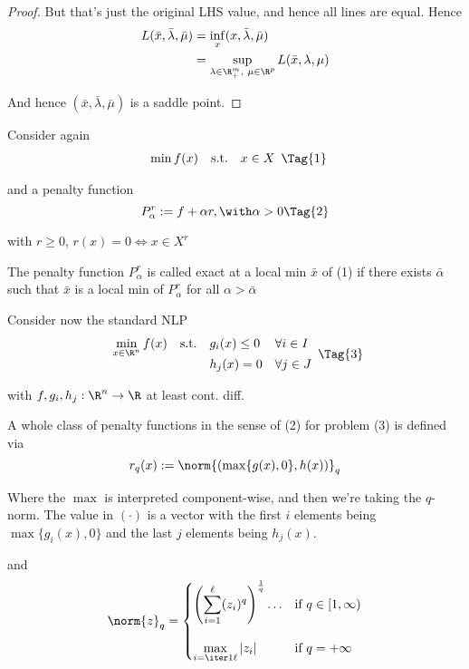 \begin{proof}
  But that's just the original LHS value, and hence all lines are equal. Hence
  \begin{align*}
    L(\bar x,\bar\lambda,\bar\mu)
     & =\inf_{x} (x,\bar\lambda,\bar\mu)                          \\
     & =\sup_{\lambda\in\R^m_+,\ \mu\in\R^p}L(\bar x,\lambda,\mu) \\
  \end{align*}

  And hence $(\bar x,\bar\lambda,\bar\mu)$ is a saddle point.
\end{proof}



Consider again
\begin{equation*}
  \begin{array}{l l l}
    \min f(x) & \text{s.t.} & x\in X
  \end{array}\Tag{1}
\end{equation*}

and a penalty function
\begin{equation*}
  P_\alpha^r:=f+\alpha r,\with \alpha>0\Tag{2}
\end{equation*}

with $r\geq0$, $r(x)=0\iff x\in X^r$


The penalty function $P_\alpha^r$ is called exact at a local min $\bar x$ of
(1) if there exists $\bar\alpha$ such that $\bar x$ is a local min of
$P_\alpha^r$ for all $\alpha>\bar\alpha$

Consider now the standard NLP
\begin{equation*}
  \NlpStdForm\Tag{3}
\end{equation*}

with $f,g_i,h_j:\R^n\to\R$ at least cont. diff.

A whole class of penalty functions in the sense of (2) for problem (3) is
defined via
$$
  r_q(x):=\norm{(\max\{g(x),0\},h(x))}_q
$$

Where the $\max$ is interpreted component-wise, and then we're taking the
$q$-norm. The value in $(\cdot)$ is a vector with the first $i$ elements being
$\max\{g_i(x),0\}$ and the last $j$ elements being $h_j(x)$.

and
$$
  \norm{z}_q=\begin{cases}
    \displaystyle\left(\sum_{i=1}^\ell (z_i)^q \right)^{\frac1q} \ldots
                                          & \text{if } q\in[1,\infty) \\[2em]
    \displaystyle\max_{i=\iter1\ell}|z_i| & \text{if } q=+\infty
  \end{cases}
$$

